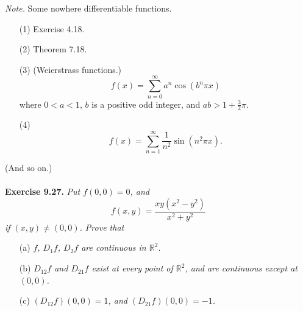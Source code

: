 \documentclass{article}
\begin{document}
\emph{Note.} Some nowhere differentiable functions.
  \begin{enumerate}
  \item[(1)]
    Exercise 4.18.

  \item[(2)]
    Theorem 7.18.

  \item[(3)]
    (Weierstrass functions.)
    \[
      f(x) = \sum_{n=0}^{\infty} a^n \cos(b^n \pi x)
    \]
    where $0 < a < 1$, $b$ is a positive odd integer, and $ab > 1 + \frac{3}{2}\pi$.

  \item[(4)]
    \[
      f(x) = \sum_{n=1}^{\infty} \frac{1}{n^2}\sin(n^2 \pi x).
    \]
  \end{enumerate}
  (And so on.) \\\\






\textbf{Exercise 9.27.}
\emph{Put $f(0,0) = 0$, and
\[
  f(x,y) = \frac{xy(x^2-y^2)}{x^2+y^2}
\]
if $(x,y) \neq (0,0)$. Prove that}
\begin{enumerate}
\item[(a)]
  \emph{$f$, $D_1 f$, $D_2 f$ are continuous in $\mathbb{R}^2$.}

\item[(b)]
  \emph{$D_{12}f$ and $D_{21}f$ exist at every point of $\mathbb{R}^2$,
  and are continuous except at $(0,0)$.}

\item[(c)]
  \emph{$(D_{12}f)(0,0) = 1$, and $(D_{21}f)(0,0) = -1$.} \\
\end{enumerate}
\end{document}
